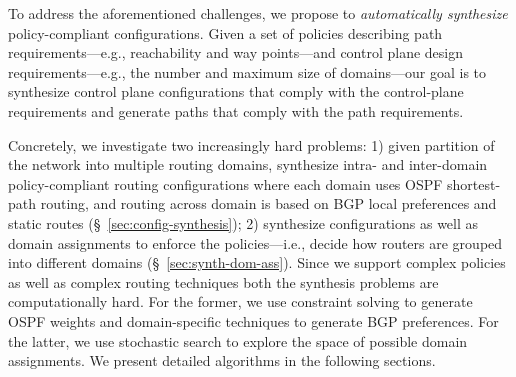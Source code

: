  To address the aforementioned
challenges, we propose to \emph{automatically synthesize}
policy-compliant configurations.  Given a set of policies describing
path requirements---e.g., reachability and way points---and control
plane design requirements---e.g., the number and maximum size of
domains---our goal is to synthesize control plane configurations that
comply with the control-plane requirements and generate paths that
comply with the path requirements. 

Concretely, we investigate two increasingly
hard problems: 1) given partition of the network into multiple routing
domains, synthesize intra- and inter-domain policy-compliant routing  configurations
where each domain uses OSPF shortest-path routing, and
routing across domain is based on BGP local preferences and static
routes (\S~\ref{sec:config-synthesis}); 2) synthesize configurations
as well as domain assignments to enforce the policies---i.e., decide how routers are grouped
into different domains
(\S~\ref{sec:synth-dom-ass}).  Since we support complex
policies as well as complex
routing techniques both the synthesis
problems are computationally hard.  For the former, we use
constraint solving to generate OSPF weights and domain-specific
techniques to generate BGP preferences. For the latter, we use stochastic
search to explore the space of possible domain assignments.
We present detailed algorithms in the following sections. 
